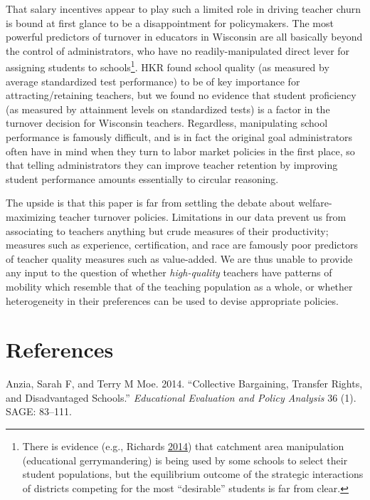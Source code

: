 \documentclass[12pt,]{article}
\let\rmarkdownfootnote\footnote%
\def\footnote{\protect\rmarkdownfootnote}
\begin{document}
That salary incentives appear to play such a limited role in driving
teacher churn is bound at first glance to be a disappointment for
policymakers. The most powerful predictors of turnover in educators in
Wisconsin are all basically beyond the control of administrators, who
have no readily-manipulated direct lever for assigning students to
schools\footnote{There is evidence (e.g., Richards
  \protect\hyperlink{ref-richards}{2014}) that catchment area
  manipulation (educational gerrymandering) is being used by some
  schools to select their student populations, but the equilibrium
  outcome of the strategic interactions of districts competing for the
  most ``desirable'' students is far from clear.}. HKR found school
quality (as measured by average standardized test performance) to be of
key importance for attracting/retaining teachers, but we found no
evidence that student proficiency (as measured by attainment levels on
standardized tests) is a factor in the turnover decision for Wisconsin
teachers. Regardless, manipulating school performance is famously
difficult, and is in fact the original goal administrators often have in
mind when they turn to labor market policies in the first place, so that
telling administrators they can improve teacher retention by improving
student performance amounts essentially to circular reasoning.

The upside is that this paper is far from settling the debate about
welfare-maximizing teacher turnover policies. Limitations in our data
prevent us from associating to teachers anything but crude measures of
their productivity; measures such as experience, certification, and race
are famously poor predictors of teacher quality measures such as
value-added. We are thus unable to provide any input to the question of
whether \emph{high-quality} teachers have patterns of mobility which
resemble that of the teaching population as a whole, or whether
heterogeneity in their preferences can be used to devise appropriate
policies.

\section*{References}\label{references}

\hypertarget{refs}{}
\hypertarget{ref-anzia}{}
Anzia, Sarah F, and Terry M Moe. 2014. ``Collective Bargaining, Transfer
Rights, and Disadvantaged Schools.'' \emph{Educational Evaluation and
Policy Analysis} 36 (1). SAGE: 83--111.
\end{document}
